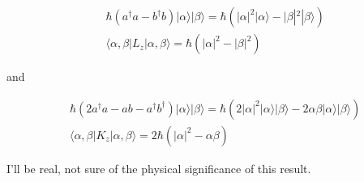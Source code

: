 \documentclass{article}
\newcommand{\p}[1]{\left(#1\right)}
\newcommand{\braket}[1]{\langle#1\rangle}
\newcommand{\bra}[1]{|#1\rangle}
\begin{document}
\begin{align*}
    &\hbar\p{a^{\dagger}a-b^{\dagger}b}\bra{\alpha}\bra{\beta}=\hbar\p{|\alpha|^2\bra{\alpha}-|\beta|^2\bra{\beta}}\\[1em]
    &\braket{\alpha,\beta|L_z|\alpha,\beta}=\hbar\p{|\alpha|^2-|\beta|^2}
\end{align*}

and

\begin{align*}
    &\hbar\p{2a^{\dagger}a-ab-a^{\dagger}b^{\dagger}}\bra{\alpha}\bra{\beta}=\hbar\p{2|\alpha|^2\bra{\alpha}\bra{\beta}-2\alpha\beta\bra{\alpha}\bra{\beta}}\\[1em]
    &\braket{\alpha,\beta|K_z|\alpha,\beta}=2\hbar\p{|\alpha|^2-\alpha\beta}
\end{align*}

I'll be real, not sure of the physical significance of this result.
\end{document}
